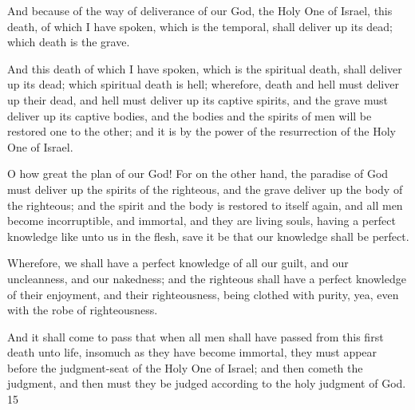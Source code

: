 And because of the way of deliverance of our God, the Holy One of Israel, this death, of
which I have spoken, which is the temporal, shall deliver up its dead; which death is the
grave.

And this death of which I have spoken, which is the spiritual death, shall deliver up its dead;
which spiritual death is hell; wherefore, death and hell must deliver up their dead, and hell
must deliver up its captive spirits, and the grave must deliver up its captive bodies, and the
bodies and the spirits of men will be restored one to the other; and it is by the power of the
resurrection of the Holy One of Israel.

O how great the plan of our God! For on the other hand, the paradise of God must deliver up
the spirits of the righteous, and the grave deliver up the body of the righteous; and the spirit
and the body is restored to itself again, and all men become incorruptible, and immortal, and
they are living souls, having a perfect knowledge like unto us in the flesh, save it be that our
knowledge shall be perfect.

Wherefore, we shall have a perfect knowledge of all our guilt, and our uncleanness, and our
nakedness; and the righteous shall have a perfect knowledge of their enjoyment, and their
righteousness, being clothed with purity, yea, even with the robe of righteousness.

And it shall come to pass that when all men shall have passed from this first death unto life,
insomuch as they have become immortal, they must appear before the judgment-seat of the
Holy One of Israel; and then cometh the judgment, and then must they be judged according
to the holy judgment of God. 15

